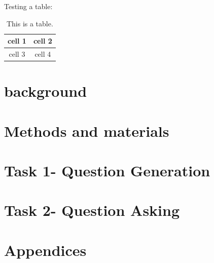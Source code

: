 \documentclass[11pt, a4paper]{article}
\begin{document}
Testing a table:
\begin{table}[htbp]
\begin{center}
\begin{tabular}{c|c}
cell 1 & cell 2 \\
\hline
cell 3 & cell 4
\end{tabular}
\caption{This is a table.}
\end{center}
\end{table}



\newpage

\section{background}
\label{sec:background}


\newpage

\section{Methods and materials}
\label{sec:methods}


\newpage

\section{Task 1- Question Generation}
\label{sec:task1}



\section{Task 2- Question Asking}
\label{sec:task2}





\newpage
\section{Appendices}
\end{document}
